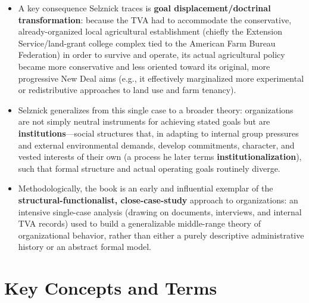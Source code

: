 \documentclass[12pt]{article}
\begin{document}
\begin{itemize}[leftmargin=*, itemsep=4pt]
    \item A key consequence Selznick traces is \textbf{goal displacement/doctrinal transformation}: because the TVA had to accommodate the conservative, already-organized local agricultural establishment (chiefly the Extension Service/land-grant college complex tied to the American Farm Bureau Federation) in order to survive and operate, its actual agricultural policy became more conservative and less oriented toward its original, more progressive New Deal aims (e.g., it effectively marginalized more experimental or redistributive approaches to land use and farm tenancy).
    \item Selznick generalizes from this single case to a broader theory: organizations are not simply neutral instruments for achieving stated goals but are \textbf{institutions}---social structures that, in adapting to internal group pressures and external environmental demands, develop commitments, character, and vested interests of their own (a process he later terms \textbf{institutionalization}), such that formal structure and actual operating goals routinely diverge.
    \item Methodologically, the book is an early and influential exemplar of the \textbf{structural-functionalist, close-case-study} approach to organizations: an intensive single-case analysis (drawing on documents, interviews, and internal TVA records) used to build a generalizable middle-range theory of organizational behavior, rather than either a purely descriptive administrative history or an abstract formal model.
\end{itemize}

\section{Key Concepts and Terms}
\end{document}
